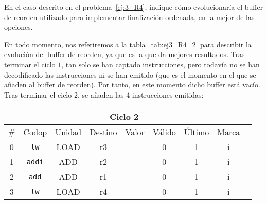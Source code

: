 \begin{ejercicio}
    En el caso descrito en el problema~\ref{ej:3_R4}, indique cómo evolucionaría el buffer de reorden utilizado para implementar finalización ordenada, en la mejor de las opciones.

    En todo momento, nos referiremos a la tabla~\ref{tab:ej3_R4_2} para describir la evolución del buffer de reorden, ya que es la que da mejores resultados.
    Tras terminar el ciclo $1$, tan solo se han captado instrucciones, pero todavía no se han decodificado las instrucciones ni se han emitido (que es el momento en el que se añaden al buffer de reorden).
    Por tanto, en este momento dicho buffer está vacío. Tras terminar el ciclo $2$, se añaden las 4 instrucciones emitidas:
    \begin{center}
        \scriptsize
        \begin{tabular}{|c|c|c|c|c|c|c|c|c|}
            \hline
            \multicolumn{8}{|c|}{Ciclo 2} \\
            \hline
            \# & Codop      & Unidad & Destino & Valor & Válido & Último & Marca \\ \hline
            0  & \verb|lw|  & LOAD   & r3      &       & 0      & 1      & i     \\ \hline
            1  & \verb|addi|& ADD    & r2      &       & 0      & 1      & i     \\ \hline
            2  & \verb|add| & ADD    & r1      &       & 0      & 1      & i     \\ \hline
            3  & \verb|lw|  & LOAD   & r4      &       & 0      & 1      & i     \\ \hline
        \end{tabular}
    \end{center}


\end{ejercicio}
